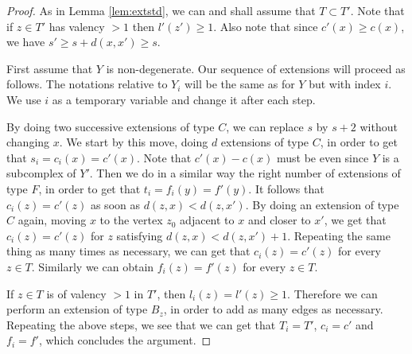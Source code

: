 \documentclass[10pt,a4paper]{amsart}
\begin{document}
\begin{proof}

As in Lemma \ref{lem:extstd}, we can and shall assume that $T\subset T'$. Note that if $z\in T'$ has valency $>1$ then $l'(z')\geq 1$.
Also note that since $c'(x)\geq c(x)$, we have $s'\geq s+d(x,x')\geq s$. 




First assume that $Y$ is non-degenerate.
 Our sequence of extensions will proceed as follows. The notations relative to $Y_i$ will be the same as for $Y$ but with index $i$. We use $i$ as a temporary variable and change it after each step.

 By doing two successive extensions of type $C$, we can replace $s$ by $s+2$ without changing $x$. We start by this move, doing $d$ extensions of type $C$, in order to get that $s_i=c_i(x)=c'(x)$. Note that $c'(x)-c(x)$ must be even since $Y$ is a subcomplex of $Y'$.  
  Then we do in a similar way the right number of extensions of type $F$, in order to get that $t_{i}=f_{i}(y)=f'(y)$. It follows that $c_i(z)=c'(z)$ as soon as $d(z,x)<d(z,x')$. By doing an extension of type $C$ again, moving $x$ to the vertex $z_0$ adjacent to $x$ and closer to $x'$, we get that  $c_i(z)=c'(z)$ for $z$ satisfying $d(z,x)<d(z,x')+1$. Repeating the same thing as many times as necessary, we can get that $c_i(z)=c'(z)$ for every $z\in T$. Similarly we can obtain $f_i(z)=f'(z)$ for every $z\in T$. 
  
  If $z\in T$ is of valency $>1$ in $T'$, then $l_i(z)=l'(z)\geq 1$. Therefore we can perform an extension of type $B_z$, in order to add as many edges as necessary. Repeating the above steps, we see that we can get that $T_i=T'$, $c_i=c'$ and $f_i=f'$, which concludes the argument.


\end{proof}
\end{document}
